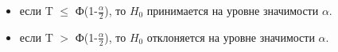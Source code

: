 \begin{itemize}
	\item если T $\leq$ Ф(1-$\frac{\alpha}{2}$), то $H_{0}$ принимается на уровне значимости $\alpha$.

	\item если T $>$ Ф(1-$\frac{\alpha}{2}$), то $H_{0}$ отклоняется на уровне значимости $\alpha$.
\end{itemize}

